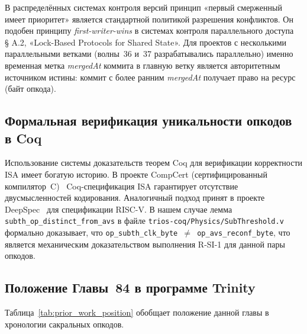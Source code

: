 В распределённых системах контроля версий принцип «первый смерженный
имеет приоритет» является стандартной политикой разрешения конфликтов.
Он подобен принципу \emph{first-writer-wins} в системах контроля
параллельного доступа~\cite{hennessy_patterson_5ed} § A.2,
«Lock-Based Protocols for Shared State».
Для проектов с несколькими параллельными ветками
(волны~36 и~37 разрабатывались параллельно) именно временная метка
\textit{mergedAt} коммита в главную ветку является авторитетным
источником истины: коммит с более ранним \textit{mergedAt}
получает право на ресурс (байт опкода).

\subsection{Формальная верификация уникальности опкодов в Coq}

Использование системы доказательств теорем Coq для верификации
корректности ISA имеет богатую историю.  В проекте CompCert
(сертифицированный компилятор~C)~\cite{leroy_compcert_2009}
Coq-спецификация ISA гарантирует отсутствие двусмысленностей
кодирования.  Аналогичный подход принят в проекте
DeepSpec~\cite{deepspec_2017} для спецификации RISC-V.
В нашем случае лемма \texttt{subth\_op\_distinct\_from\_avs}
в файле \texttt{trios-coq/Physics/SubThreshold.v}~\cite{pr661_t27}
формально доказывает, что \texttt{op\_subth\_clk\_byte~$\neq$~op\_avs\_reconf\_byte},
что является механическим доказательством выполнения R-SI-1
для данной пары опкодов.

\subsection{Положение Главы~84 в программе Trinity}

Таблица~\ref{tab:prior_work_position} обобщает положение данной главы
в хронологии сакральных опкодов.

